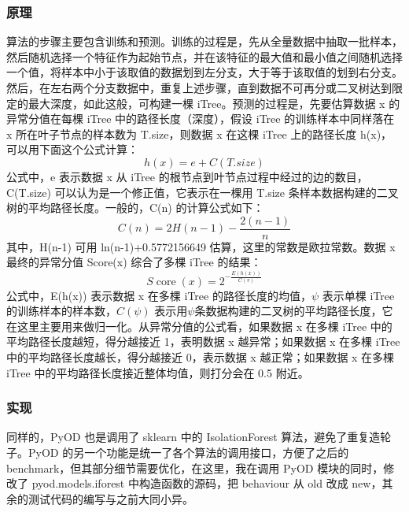 \documentclass[UTF8]{ctexart}
\begin{document}
        \subsubsection{原理}
            算法的步骤主要包含训练和预测。训练的过程是，先从全量数据中抽取一批样本，然后随机选择一个特征作为起始节点，并在该特征的最大值和最小值之间随机选择一个值，将样本中小于该取值的数据划到左分支，大于等于该取值的划到右分支。然后，在左右两个分支数据中，重复上述步骤，直到数据不可再分或二叉树达到限定的最大深度，如此这般，可构建一棵 iTree。预测的过程是，先要估算数据 x 的异常分值在每棵 iTree 中的路径长度（深度），假设 iTree 的训练样本中同样落在 x 所在叶子节点的样本数为 T.size，则数据 x 在这棵 iTree 上的路径长度 h(x)，可以用下面这个公式计算：$$h(x)=e+C(T . { size })$$ 公式中，e 表示数据 x 从 iTree 的根节点到叶节点过程中经过的边的数目，C(T.size) 可以认为是一个修正值，它表示在一棵用 T.size 条样本数据构建的二叉树的平均路径长度。一般的，C(n) 的计算公式如下：$$ C(n)=2 H(n-1)-\frac{2(n-1)}{n} $$ 其中，H(n-1) 可用 ln(n-1)+0.5772156649 估算，这里的常数是欧拉常数。数据 x 最终的异常分值 Score(x) 综合了多棵 iTree 的结果：$$ S \operatorname{core}(x)=2^{-\frac{E(h(x))}{C(v)}} $$ 公式中，E(h(x)) 表示数据 x 在多棵 iTree 的路径长度的均值，\(\psi\) 表示单棵 iTree 的训练样本的样本数，\(C(\psi)\) 表示用\(\psi\)条数据构建的二叉树的平均路径长度，它在这里主要用来做归一化。从异常分值的公式看，如果数据 x 在多棵 iTree 中的平均路径长度越短，得分越接近 1，表明数据 x 越异常；如果数据 x 在多棵 iTree 中的平均路径长度越长，得分越接近 0，表示数据 x 越正常；如果数据 x 在多棵 iTree 中的平均路径长度接近整体均值，则打分会在 0.5 附近。 \cite{link6}

        \subsubsection{实现}
            同样的，PyOD 也是调用了 sklearn 中的 IsolationForest 算法，避免了重复造轮子。PyOD 的另一个功能是统一了各个算法的调用接口，方便了之后的 benchmark，但其部分细节需要优化，在这里，我在调用 PyOD 模块的同时，修改了 pyod.models.iforest 中构造函数的源码，把 behaviour 从 old 改成 new，其余的测试代码的编写与之前大同小异。
\end{document}
